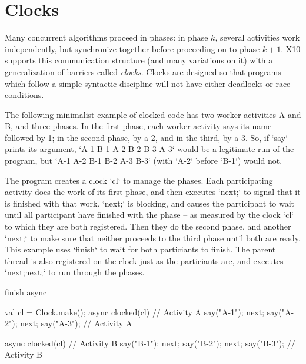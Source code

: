 \chapter{Clocks}\label{XtenClocks}

Many concurrent algorithms proceed in phases: in phase {$k$}, several
activities work independently, but synchronize together before proceeding on
to phase {$k+1$}. X10 supports this communication structure (and many
variations on it) with a generalization of barriers 
called {\em clocks}. Clocks are designed so that programs which follow a
simple syntactic discipline will not have either deadlocks or race conditions.


The following minimalist example of clocked code has two worker activities A
and B, and three phases. In the first phase, each worker activity says its
name followed by 1; in the second phase, by a 2, and in the third, by a 3.  
So, if \xcd`say` prints its argument, 
\xcd`A-1 B-1 A-2 B-2 B-3 A-3`
would be a legitimate run of the program, but
\xcd`A-1 A-2 B-1 B-2 A-3 B-3`
(with \xcd`A-2` before \xcd`B-1`) would not.

The program creates a clock \xcd`cl` to manage the phases.  Each participating
activity does
the work of its first phase, and then executes \xcd`next;` to signal that it
is finished with that work. \xcd`next;` is blocking, and causes the participant to
wait until all participant have finished with the phase -- as measured by the
clock \xcd`cl` to which they are both registered.  
Then they do the second phase, and another \xcd`next;` to make sure that
neither proceeds to the third phase until both are ready.  This example uses
\xcd`finish` to wait for both particiants to finish.  The parent thread is also
registered on the clock just as the particiants are, and executes \xcd`next;next;`
to run through the phases.



\begin{xten}
    finish async{
      val cl = Clock.make();
      async clocked(cl) {// Activity A
        say("A-1");
        next;
        say("A-2");
        next;
        say("A-3"); 
      }// Activity A

      async clocked(cl) {// Activity B
        say("B-1");
        next;
        say("B-2");
        next;
        say("B-3"); 
      }// Activity B
    }
\end{xten}

